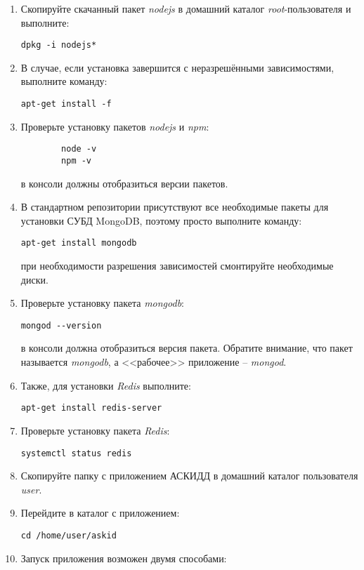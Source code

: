 \begin{enumerate}
\item Скопируйте скачанный пакет \textit{nodejs} в домашний каталог \textit{root}-пользователя и выполните:
	
	\verb|dpkg -i nodejs*|

\item В случае, если установка завершится с неразрешёнными зависимостями, выполните команду:
	
	\verb|apt-get install -f|

\item Проверьте установку пакетов \textit{nodejs} и \textit{npm}:
	
	\begin{verbatim}
		node -v
		npm -v
	\end{verbatim}
в консоли должны отобразиться версии пакетов.

\item В стандартном репозитории присутствуют все необходимые пакеты для установки СУБД MongoDB, поэтому просто выполните команду:
	
	\verb|apt-get install mongodb|

при необходимости разрешения зависимостей смонтируйте необходимые диски.

\item Проверьте установку пакета \textit{mongodb}:
	
	\verb|mongod --version|

в консоли должна отобразиться версия пакета. Обратите внимание, что пакет называется \textit{mongodb}, а <<рабочее>> приложение -- \textit{mongod}.

\item Также, для установки \textit{Redis} выполните:

	\verb|apt-get install redis-server|
	
\item Проверьте установку пакета \textit{Redis}:

	\verb|systemctl status redis|
	
\item Скопируйте папку с приложением АСКИДД в домашний каталог пользователя \textit{user}.

\item Перейдите в каталог с приложением:
	
	\verb|cd /home/user/askid|
	
\item Запуск приложения возможен двумя способами:
\end{enumerate}
